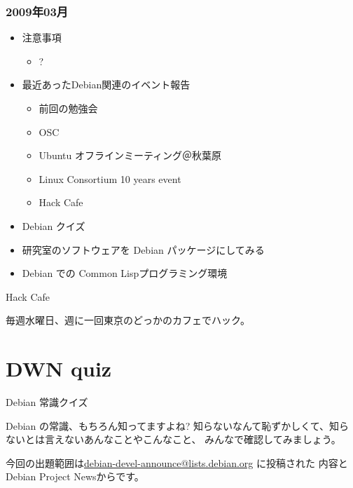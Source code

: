 \begin{frame}
 \frametitle{2009年03月}
\begin{minipage}[t]{0.45\hsize}
  \begin{itemize}
  \item 注意事項
	\begin{itemize}
	 \item ?
	\end{itemize}
  \item 最近あったDebian関連のイベント報告
	\begin{itemize}
	 \item 前回の勉強会
	 \item OSC
	 \item Ubuntu オフラインミーティング＠秋葉原
	 \item Linux Consortium 10 years event
	 \item Hack Cafe
	\end{itemize}
 \end{itemize}
\end{minipage} 
\begin{minipage}[t]{0.45\hsize}
 \begin{itemize}
  \item Debian クイズ
  \item 研究室のソフトウェアを Debian パッケージにしてみる
  \item Debian での Common Lispプログラミング環境
 \end{itemize}
\end{minipage}
\end{frame}

\begin{frame}{Hack Cafe}

毎週水曜日、週に一回東京のどっかのカフェでハック。

\end{frame}

\section{DWN quiz}
\begin{frame}{Debian 常識クイズ}

Debian の常識、もちろん知ってますよね?
知らないなんて恥ずかしくて、知らないとは言えないあんなことやこんなこと、
みんなで確認してみましょう。

今回の出題範囲は\url{debian-devel-announce@lists.debian.org} に投稿された
内容とDebian Project Newsからです。

\end{frame}

